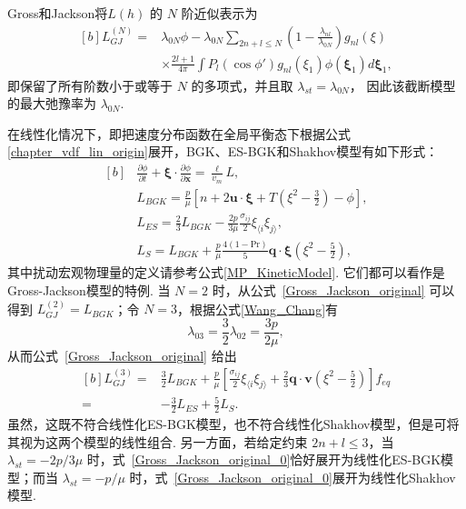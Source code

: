 Gross和Jackson将${L}(h)$ 的 $N$ 阶近似表示为
\begin{equation}\label{Gross_Jackson_original}
\begin{aligned}[b]
{L}_{GJ}^{(N)}=&\lambda_{0N}\phi -\lambda_{0N}\sum_{2n+l\le{N}} \left(1-\frac{\lambda_{nl}}{\lambda_{0N}}\right)g_{nl}(\xi)\\
&\times\frac{2l+1}{4\pi} \int{}P_l(\cos\phi')g_{nl}(\xi_1)\phi(\bm{\xi}_1) d\bm{\xi}_1,
\end{aligned}
\end{equation}
即保留了所有阶数小于或等于 $N$ 的多项式，并且取 $\lambda_{st}=\lambda_{0N}$， 因此该截断模型的最大弛豫率为 $\lambda_{0N}$.  %


在线性化情况下，即把速度分布函数在全局平衡态下根据公式\eqref{chapter_vdf_lin_origin}展开，BGK、ES-BGK和Shakhov模型有如下形式：
\begin{equation}
\begin{aligned}[b]
&\frac{\partial \phi}{\partial{}t}
+{\bm{\xi}}\cdot\frac{\partial
	\phi}{\partial \bm{x}}
=\frac{\ell}{v_m}{L},\\
&{L}_{BGK}=\frac{p}{\mu}\left[{n}+2\bm{u}\cdot\bm{\xi}+T\left(\xi^2-\frac{3}{2}\right)-\phi\right],\\
&{L}_{ES}=\frac{2}{3}{L}_{BGK}-\frac{2p}{3\mu}
\frac{\sigma_{ij}}{2}\xi_{\langle i}\xi_{j\rangle},\\
&{L}_{S}={L}_{BGK} +\frac{p}{\mu}\frac{4(1-\text{Pr})}{5}\bm{q}\cdot\bm{\xi}\left(\xi^2-\frac{5}{2}\right),
\end{aligned}
\end{equation}
其中扰动宏观物理量的定义请参考公式\eqref{MP_KineticModel}. 
它们都可以看作是Gross-Jackson模型的特例. 
当 $N=2$ 时，从公式~\eqref{Gross_Jackson_original} 可以得到 ${L}_{GJ}^{(2)}={L}_{BGK}$；令 $N=3$，根据公式\eqref{Wang_Chang}有
\begin{equation}
\lambda_{03}=\frac{3}{2}\lambda_{02}=\frac{3p}{2\mu},
\end{equation}
从而公式~\eqref{Gross_Jackson_original} 给出
\begin{equation*}\label{Gross_Jackson_N3}
\begin{aligned}[b]
{L}_{GJ}^{(3)}=&\frac{3}{2}L_{BGK}+\frac{p}{\mu}\left[\frac{\sigma_{ij}}{2}\xi_{\langle i}\xi_{j\rangle}
+\frac{2}{3}\bm{q}\cdot\bm{v}\left(
\xi^2-\frac{5}{2}\right)\right]f_{eq}\\
=&-\frac{3}{2}{L}_{ES}+\frac{5}{2}{L}_{S}.
\end{aligned}
\end{equation*}
虽然，这既不符合线性化ES-BGK模型，也不符合线性化Shakhov模型，但是可将其视为这两个模型的线性组合. 
另一方面，若给定约束 $2n+l\le3$，当$\lambda_{st}=-2p/3\mu$ 时，式~\eqref{Gross_Jackson_original_0}恰好展开为线性化ES-BGK模型；而当 $\lambda_{st}=-p/\mu$ 时，式~\eqref{Gross_Jackson_original_0}展开为线性化Shakhov模型. 


